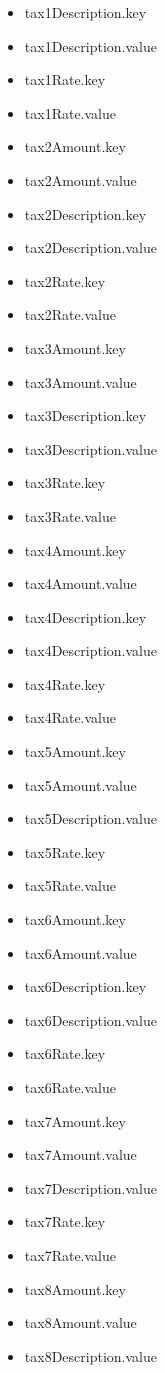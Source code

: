 \begin{multicols}{2}
\begin{itemize}
\item[] tax1Description.key
\item[] tax1Description.value
\item[] tax1Rate.key
\item[] tax1Rate.value
\item[] tax2Amount.key
\item[] tax2Amount.value
\item[] tax2Description.key
\item[] tax2Description.value
\item[] tax2Rate.key
\item[] tax2Rate.value
\item[] tax3Amount.key
\item[] tax3Amount.value
\item[] tax3Description.key
\item[] tax3Description.value
\item[] tax3Rate.key
\item[] tax3Rate.value
\item[] tax4Amount.key
\item[] tax4Amount.value
\item[] tax4Description.key
\item[] tax4Description.value
\item[] tax4Rate.key
\item[] tax4Rate.value
\item[] tax5Amount.key
\item[] tax5Amount.value
\item[] tax5Description.value
\item[] tax5Rate.key
\item[] tax5Rate.value
\item[] tax6Amount.key
\item[] tax6Amount.value
\item[] tax6Description.key
\item[] tax6Description.value
\item[] tax6Rate.key
\item[] tax6Rate.value
\item[] tax7Amount.key
\item[] tax7Amount.value
\item[] tax7Description.value
\item[] tax7Rate.key
\item[] tax7Rate.value
\item[] tax8Amount.key
\item[] tax8Amount.value
\item[] tax8Description.value

\end{itemize}
\end{multicols}
